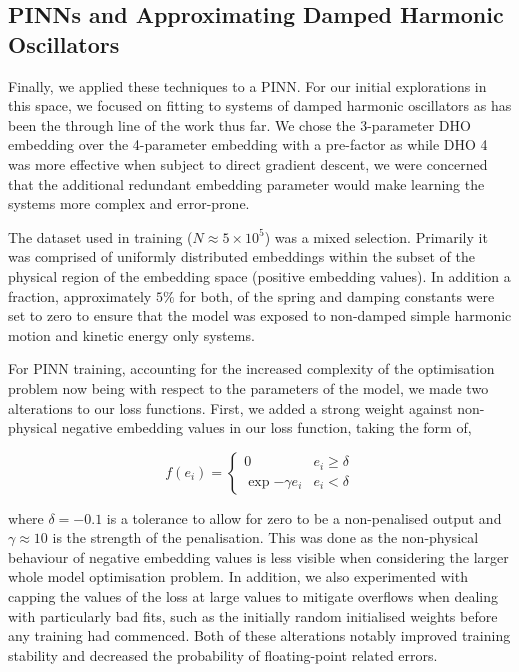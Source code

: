 \subsection{PINNs and Approximating Damped Harmonic Oscillators}

Finally, we applied these techniques to a PINN. For our initial explorations in this space, we focused on fitting to systems of damped harmonic oscillators as has been the through line of the work thus far. We chose the 3-parameter DHO embedding over the 4-parameter embedding with a pre-factor as while DHO 4 was more effective when subject to direct gradient descent, we were concerned that the additional redundant embedding parameter would make learning the systems more complex and error-prone.

The dataset used in training ($N \approx 5 \times 10^5$) was a mixed selection. Primarily it was comprised of uniformly distributed embeddings within the subset of the physical region of the embedding space (positive embedding values). In addition a fraction, approximately $5 \%$ for both, of the spring and damping constants were set to zero to ensure that the model was exposed to non-damped simple harmonic motion and kinetic energy only systems.

For PINN training, accounting for the increased complexity of the optimisation problem now being with respect to the parameters of the model, we made two alterations to our loss functions. First, we added a strong weight against non-physical negative embedding values in our loss function, taking the form of,

\begin{equation}
  f(e_i) = \begin{cases}
  	0 & e_i \ge \delta \\
  	\exp{-\gamma e_i} & e_i < \delta 
  \end{cases}
\end{equation}

\noindent where $\delta = −0.1$ is a tolerance to allow for zero to be a non-penalised output and $\gamma \approx 10$ is the strength of the penalisation. This was done as the non-physical behaviour of negative embedding values is less visible when considering the larger whole model optimisation problem.
In addition, we also experimented with capping the values of the loss at large values to mitigate overflows when dealing with particularly bad fits, such as the initially random initialised weights before any training had commenced. Both of these alterations notably improved training stability and decreased the probability of floating-point related errors.

